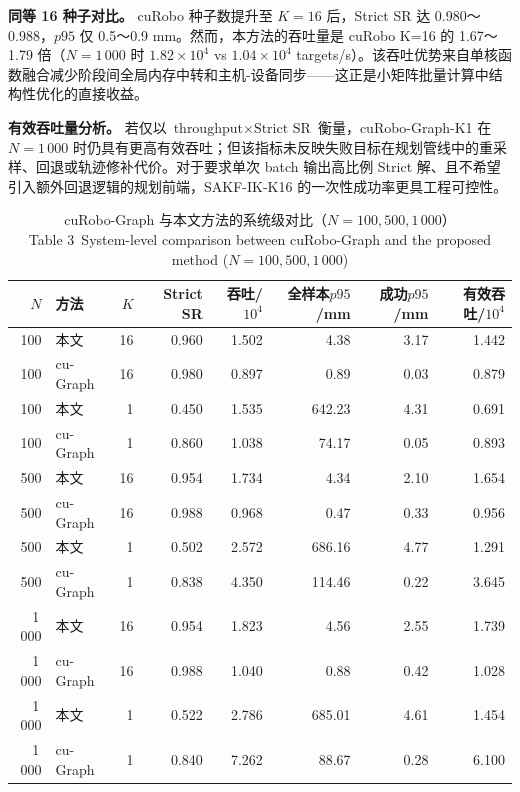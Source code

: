 \documentclass[twocolumn,a4paper,10pt]{ctexart}
\begin{document}
\textbf{同等 16 种子对比。} cuRobo 种子数提升至 $K=16$ 后，Strict SR 达 0.980～0.988，$p95$ 仅 0.5～0.9 mm。然而，本方法的吞吐量是 cuRobo K=16 的 1.67～1.79 倍（$N=1\,000$ 时 $1.82\times10^4$ vs $1.04\times10^4$ targets/s）。该吞吐优势来自单核函数融合减少阶段间全局内存中转和主机-设备同步——这正是小矩阵批量计算中结构性优化的直接收益。

\textbf{有效吞吐量分析。} 若仅以 $\text{throughput}\times\text{Strict SR}$ 衡量，cuRobo-Graph-K1 在 $N=1\,000$ 时仍具有更高有效吞吐；但该指标未反映失败目标在规划管线中的重采样、回退或轨迹修补代价。对于要求单次 batch 输出高比例 Strict 解、且不希望引入额外回退逻辑的规划前端，SAKF-IK-K16 的一次性成功率更具工程可控性。

\begin{table}[tp]
\centering
\caption{cuRobo-Graph 与本文方法的系统级对比（$N=100,500,1\,000$）\\[2pt] {\small Table 3~System-level comparison between cuRobo-Graph and the proposed method ($N=100,500,1\,000$)}}
\label{tab:curobo}
\scriptsize
\setlength{\tabcolsep}{4pt}
\begin{tabular}{rlrrrrrr}
\toprule
$N$ & 方法 & $K$ & Strict SR & 吞吐/$10^4$ & 全样本$p95$/mm & 成功$p95$/mm & 有效吞吐/$10^4$\\
\midrule
100 & 本文 & 16 & 0.960 & 1.502 & 4.38 & 3.17 & 1.442\\
100 & cu-Graph & 16 & 0.980 & 0.897 & 0.89 & 0.03 & 0.879\\
100 & 本文 & 1 & 0.450 & 1.535 & 642.23 & 4.31 & 0.691\\
100 & cu-Graph & 1 & 0.860 & 1.038 & 74.17 & 0.05 & 0.893\\
\midrule
500 & 本文 & 16 & 0.954 & 1.734 & 4.34 & 2.10 & 1.654\\
500 & cu-Graph & 16 & 0.988 & 0.968 & 0.47 & 0.33 & 0.956\\
500 & 本文 & 1 & 0.502 & 2.572 & 686.16 & 4.77 & 1.291\\
500 & cu-Graph & 1 & 0.838 & 4.350 & 114.46 & 0.22 & 3.645\\
\midrule
1\,000 & 本文 & 16 & 0.954 & 1.823 & 4.56 & 2.55 & 1.739\\
1\,000 & cu-Graph & 16 & 0.988 & 1.040 & 0.88 & 0.42 & 1.028\\
1\,000 & 本文 & 1 & 0.522 & 2.786 & 685.01 & 4.61 & 1.454\\
1\,000 & cu-Graph & 1 & 0.840 & 7.262 & 88.67 & 0.28 & 6.100\\
\bottomrule
\end{tabular}
\par{}
\end{table}
\end{document}
